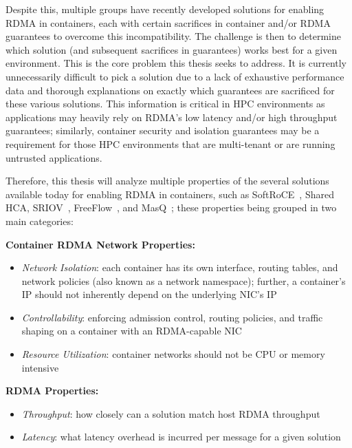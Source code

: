\documentclass[12pt,titlepage]{article}
\begin{document}
Despite this, multiple groups have recently developed solutions for enabling RDMA in containers, each with certain sacrifices in container and/or RDMA guarantees to overcome this incompatibility.
The challenge is then to determine which solution (and subsequent sacrifices in guarantees) works best for a given environment.
This is the core problem this thesis seeks to address.
It is currently unnecessarily difficult to pick a solution due to a lack of exhaustive performance data and thorough explanations on exactly which guarantees are sacrificed for these various solutions.
This information is critical in HPC environments as applications may heavily rely on RDMA's low latency and/or high throughput guarantees; similarly, container security and isolation guarantees may be a requirement for those HPC environments that are multi-tenant or are running untrusted applications.

Therefore, this thesis will analyze multiple properties of the several solutions available today for enabling RDMA in containers, such as SoftRoCE~\cite{pandeysroce}, Shared HCA, SRIOV~\cite{mellanoxdockerroce}, FreeFlow~\cite{kim2019freeflow}, and MasQ~\cite{he2020masq};
these properties being grouped in two main categories:

\noindent
\textbf{Container RDMA Network Properties:}
\begin{itemize}[nolistsep]
   \item \textit{Network Isolation}: each container has its own interface, routing tables, and network policies (also known as a network namespace); further, a container's IP should not inherently depend on the underlying NIC's IP
   \item \textit{Controllability}: enforcing admission control, routing policies, and traffic shaping on a container with an RDMA-capable NIC
   \item \textit{Resource Utilization}: container networks should not be CPU or memory intensive
\end{itemize}

\noindent
\textbf{RDMA Properties:}
\begin{itemize}[nolistsep]
   \item \textit{Throughput}: how closely can a solution match host RDMA throughput
   \item \textit{Latency}: what latency overhead is incurred per message for a given solution
\end{itemize}
\end{document}
